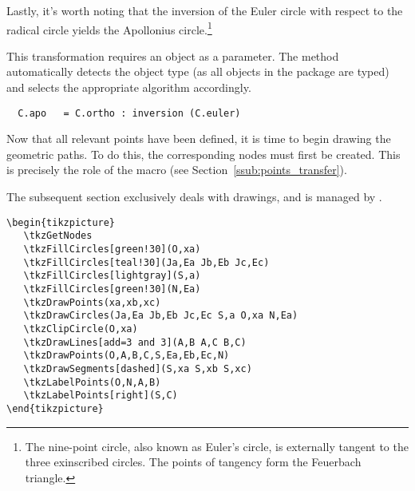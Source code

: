 \vspace{1em}

Lastly, it's worth noting that the inversion of the Euler circle with respect to the radical circle yields the Apollonius circle.\footnote{The nine-point circle, also known as Euler's circle, is externally tangent to the three exinscribed circles. The points of tangency form the Feuerbach triangle.}  

This transformation requires an object as a parameter. The method automatically detects the object type (as all objects in the package are typed) and selects the appropriate algorithm accordingly.

\begin{mybox}{}
\begin{verbatim}
  C.apo   = C.ortho : inversion (C.euler) 
\end{verbatim}
\end{mybox}

Now that all relevant points have been defined, it is time to begin drawing the geometric paths. To do this, the corresponding nodes must first be created. This is precisely the role of the macro  (see Section~\ref{ssub:points_transfer}).

The subsequent section exclusively deals with drawings, and is managed by .

\begin{verbatim}
\begin{tikzpicture}
   \tkzGetNodes
   \tkzFillCircles[green!30](O,xa)
   \tkzFillCircles[teal!30](Ja,Ea Jb,Eb Jc,Ec)
   \tkzFillCircles[lightgray](S,a)
   \tkzFillCircles[green!30](N,Ea)
   \tkzDrawPoints(xa,xb,xc)
   \tkzDrawCircles(Ja,Ea Jb,Eb Jc,Ec S,a O,xa N,Ea)
   \tkzClipCircle(O,xa)
   \tkzDrawLines[add=3 and 3](A,B A,C B,C)
   \tkzDrawPoints(O,A,B,C,S,Ea,Eb,Ec,N)
   \tkzDrawSegments[dashed](S,xa S,xb S,xc)
   \tkzLabelPoints(O,N,A,B)
   \tkzLabelPoints[right](S,C)
\end{tikzpicture}
\end{verbatim}

